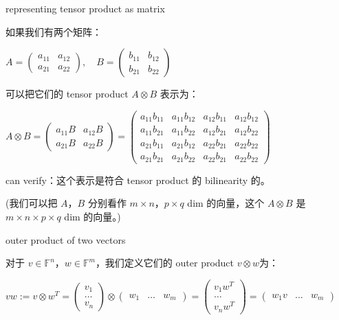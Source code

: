 \begin{proposition}{representing tensor product as matrix}

如果我们有两个矩阵：

\(A = \begin{pmatrix}
a_{11} & a_{12} \\
a_{21} & a_{22}
\end{pmatrix},\quad B = \begin{pmatrix}
b_{11} & b_{12} \\
b_{21} & b_{22}
\end{pmatrix}\)

可以把它们的 tensor product \(A \otimes B\) 表示为：

\(A \otimes B = \begin{pmatrix}
{a_{11}B} & {a_{12}B} \\
{a_{21}B} & {a_{22}B}
\end{pmatrix} = \begin{pmatrix}
{a_{11}b_{11}} & {a_{11}b_{12}} & {a_{12}b_{11}} & {a_{12}b_{12}} \\
{a_{11}b_{21}} & {a_{11}b_{22}} & {a_{12}b_{21}} & {a_{12}b_{22}} \\
{a_{21}b_{11}} & {a_{21}b_{12}} & {a_{22}b_{21}} & {a_{22}b_{22}} \\
{a_{21}b_{21}} & {a_{21}b_{22}} & {a_{22}b_{21}} & {a_{22}b_{22}}
\end{pmatrix}\)

can verify：这个表示是符合 tensor product 的 bilinearity 的。

(我们可以把 \(A\)，\(B\) 分别看作 \(m \times n\)，\(p \times q\) dim 的向量，这个 \(A \otimes B\) 是 \(m \times n \times p \times q\) dim 的向量。)

\end{proposition}

\begin{definition}{outer product of two vectors}

对于 \(v \in \mathbb{F}^{n}\)，\(w \in \mathbb{F}^{m}\)，我们定义它们的 outer product \(v \otimes w\)为：

\(vw := v \otimes w^{T} = \begin{pmatrix}
v_{1} \\
\ldots \\
v_{n}
\end{pmatrix} \otimes \begin{pmatrix}
w_{1} & \ldots & w_{m}
\end{pmatrix} = \begin{pmatrix}
{v_{1}w^{T}} \\
\ldots \\
{v_{n}w^{T}}
\end{pmatrix} = \begin{pmatrix}
{w_{1}v} & \ldots & w_{m}
\end{pmatrix}\)

\end{definition}

